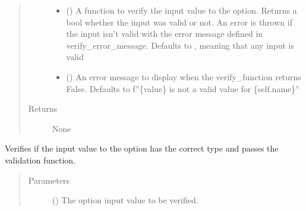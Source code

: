 \documentclass[a4paper,10pt,english]{sphinxmanual}
\begin{document}
\begin{fulllineitems}
\begin{fulllineitems}
\begin{quote}
\begin{description}
\begin{itemize}
\item {}
\sphinxAtStartPar
{} (\sphinxstyleliteralemphasis{\sphinxupquote{{[}}}\sphinxstyleliteralemphasis{\sphinxupquote{{[}}}\sphinxstyleliteralemphasis{\sphinxupquote{{]}}}\sphinxstyleliteralemphasis{\sphinxupquote{, }}\sphinxstyleliteralemphasis{\sphinxupquote{{]}}}) \textendash{} A function to verify the input value to the option. Returns a bool
whether the input was valid or not. An error is thrown if the input isn’t valid with the error message
defined in verify\_error\_message. Defaults to , meaning that any input is valid

\item {}
\sphinxAtStartPar
{} (\sphinxstyleliteralemphasis{\sphinxupquote{{[}}}\sphinxstyleliteralemphasis{\sphinxupquote{{]}}}) \textendash{} An error message to display when the verify\_function returns False.
Defaults to f”\{value\} is not a valid value for \{self.name\}”

\end{itemize}

\item[{Returns}] \leavevmode
\sphinxAtStartPar
None

\end{description}\end{quote}

\end{fulllineitems}


\begin{fulllineitems}
\label{\detokenize{fagus.utils:fagus.utils.FagusOption.verify}}
\pysigstartsignatures
{}
\pysigstopsignatures
\sphinxAtStartPar
Verifies if the input value to the option has the correct type and passes the validation function.
\begin{quote}\begin{description}
\item[{Parameters}] \leavevmode
\sphinxAtStartPar
{} () \textendash{} The option input value to be verified.


\end{description}
\end{quote}
\end{fulllineitems}
\end{fulllineitems}
\end{document}
